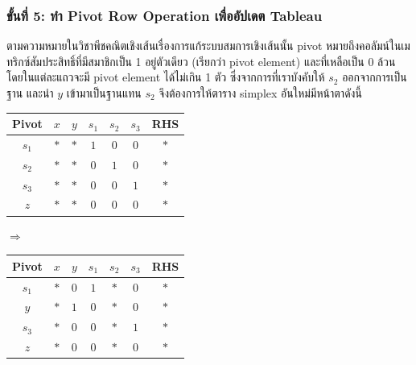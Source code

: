 \subsubsection*{ขั้นที่ 5: ทำ Pivot Row Operation เพื่ออัปเดต Tableau}

\begin{center}
\end{center}

ตามความหมายในวิชาพีชคณิตเชิงเส้นเรื่องการแก้ระบบสมการเชิงเส้นนั้น pivot หมายถึงคอลัมน์ในเมทริกซ์สัมประสิทธิ์ที่มีสมาชิกเป็น 1 อยู่ตัวเดียว (เรียกว่า pivot element) และที่เหลือเป็น 0 ล้วน โดยในแต่ละแถวจะมี pivot element ได้ไม่เกิน 1 ตัว ซึ่งจากการที่เราบังคับให้ $s_2$ ออกจากการเป็นฐาน และนำ $y$ เข้ามาเป็นฐานแทน $s_2$ จึงต้องการให้ตาราง simplex อันใหม่มีหน้าตาดังนี้
    \begin{center}
    \renewcommand{\arraystretch}{1.4}
        \begin{tabular}{|c|ccccc|c|}
            \hline
            \textbf{Pivot} & $x$ & $y$ &  $s_1$ & $s_2$ & $s_3$ & \textbf{RHS} \\
            \hline
            $s_1$ & $*$ & $*$  & $1$ & $0$ & $0$ & $*$ \\
            $s_2$ & $*$ & $*$  & $0$ & $1$ & $0$ & $*$ \\
            $s_3$ & $*$ & $*$  & $0$ & $0$ & $1$ & $*$ \\
            \hline
            $z$   & $*$ & $*$  & $0$ & $0$ & $0$ & $*$ \\
            \hline
        \end{tabular}
        $\Longrightarrow$
        \begin{tabular}{|c|ccccc|c|}
            \hline
            \textbf{Pivot} & $x$ & $y$ &  $s_1$ & $s_2$ & $s_3$ & \textbf{RHS} \\
            \hline
            $s_1$ & $*$ & $0$  & $1$ & $*$ & $0$ & $*$ \\
            $y$   & $*$ & $1$  & $0$ & $*$ & $0$ & $*$ \\
            $s_3$ & $*$ & $0$  & $0$ & $*$ & $1$ & $*$ \\
            \hline
            $z$   & $*$ & $0$  & $0$ & $*$ & $0$ & $*$ \\
            \hline
        \end{tabular}
    \end{center}

